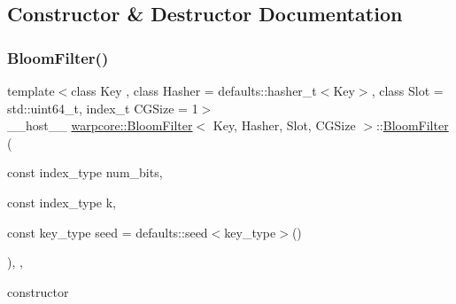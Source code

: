 \subsection{Constructor \& Destructor Documentation}
\mbox{\label{classwarpcore_1_1BloomFilter_af1dee90908f026b0a7c2e60794145f2d}} 
\subsubsection{\texorpdfstring{Bloom\+Filter()}{BloomFilter()}\hspace{0.1cm}{\footnotesize\ttfamily [1/3]}}
{\footnotesize\ttfamily template$<$class Key , class Hasher  = defaults\+::hasher\+\_\+t$<$\+Key$>$, class Slot  = std\+::uint64\+\_\+t, index\+\_\+t C\+G\+Size = 1$>$ \\
\+\_\+\+\_\+host\+\_\+\+\_\+ \hyperlink{classwarpcore_1_1BloomFilter}{warpcore\+::\+Bloom\+Filter}$<$ Key, Hasher, Slot, C\+G\+Size $>$\+::\hyperlink{classwarpcore_1_1BloomFilter}{Bloom\+Filter} (\begin{DoxyParamCaption}\item[{const index\+\_\+type}]{num\+\_\+bits,  }\item[{const index\+\_\+type}]{k,  }\item[{const key\+\_\+type}]{seed = {\ttfamily defaults\+:\+:seed$<$key\+\_\+type$>$()} }\end{DoxyParamCaption})\hspace{0.3cm}{\ttfamily [inline]}, {\ttfamily [explicit]}, {\ttfamily [noexcept]}}



constructor 


